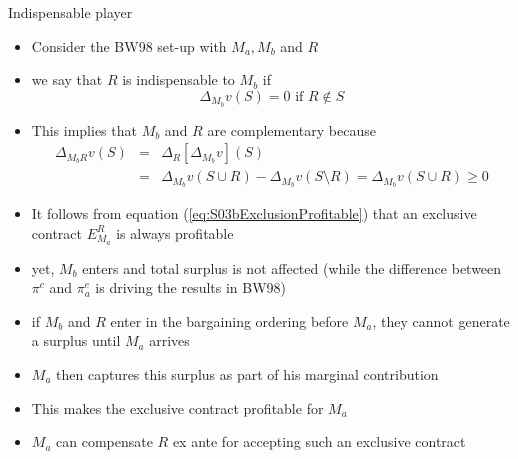 \documentclass[11pt,english]{beamer}
\begin{document}
\begin{frame}[allowframebreaks]{Indispensable player}
  \begin{itemize}
  \item Consider the BW98 set-up with $M_a,M_b$ and $R$
  \item we say that $R$ is indispensable to $M_b$ if
    \begin{equation*}
      \Delta_{M_b} v(S) = 0 \text{ if } R \notin S
    \end{equation*}
  \item This implies that $M_b$ and $R$ are complementary because
    \begin{eqnarray*}
      \Delta_{M_b R} v(S) &=& \Delta_R [\Delta_{M_b} v](S) \\
      &=& \Delta_{M_b} v(S \cup R) - \Delta_{M_b} v(S \setminus R) =
      \Delta_{M_b} v(S \cup R ) \geq 0
    \end{eqnarray*}
  \item It follows from equation (\ref{eq:S03bExclusionProfitable})
    that an exclusive contract $E_{M_a}^R$ is always profitable
  \item yet, $M_b$ enters and total surplus is not affected (while the
    difference between $\pi^c$ and $\pi^e_a$ is driving the results in BW98)
  \item if $M_b$ and $R$ enter in the bargaining ordering before
    $M_a$, they cannot generate a surplus until $M_a$ arrives
  \item $M_a$ then captures this surplus as part of his marginal
    contribution
  \item This makes the exclusive contract profitable for $M_a$
  \item $M_a$ can compensate $R$ ex ante for accepting such an
    exclusive contract
  \end{itemize}
\end{frame}
\end{document}
